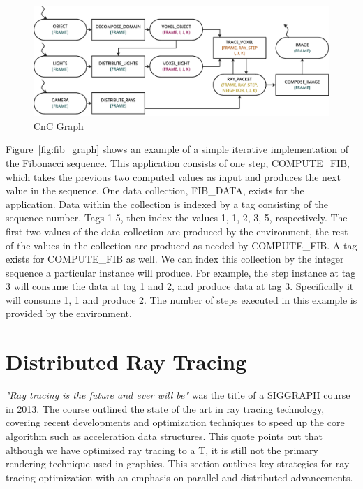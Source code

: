 \begin{figure}[t]
  \centering
  \includegraphics[width=\textwidth]{drawings/CnC.pdf}
  \caption{CnC Graph}
  \label{fig:cnc}
\end{figure}

Figure~\ref{fig:fib_graph} shows an example of a
simple iterative implementation of the Fibonacci sequence. This
application consists of one step, COMPUTE\_FIB, which takes the
previous two computed values as input and produces the next value in
the sequence. One data collection, FIB\_DATA, exists for the
application. Data within the collection is indexed by a tag consisting
of the sequence number. Tags 1-5, then index the values 1,
1, 2, 3, 5, respectively. The first two values of the data collection
are produced by the environment, the rest of the values in the
collection are produced as needed by COMPUTE\_FIB. A tag exists for
COMPUTE\_FIB as well. We can index this collection by the integer
sequence a particular instance will produce. For example, the step
instance at tag 3 will consume the data at tag 1 and 2, and produce
data at tag 3. Specifically it will consume 1, 1 and produce 2.
The number of steps executed in this example is provided by the 
environment.

\section{Distributed Ray Tracing}

\emph{"Ray tracing is the future and ever will be"} was the title of a SIGGRAPH 
course in 2013.  The course outlined the state of the art in ray tracing 
technology, covering recent developments and optimization techniques to speed up 
the core algorithm such as acceleration data structures.  This quote points out 
that although we have optimized ray tracing to a T, it is still not the primary
rendering technique used in graphics.  This section outlines key strategies for 
ray tracing optimization with an emphasis on parallel and distributed 
advancements.

